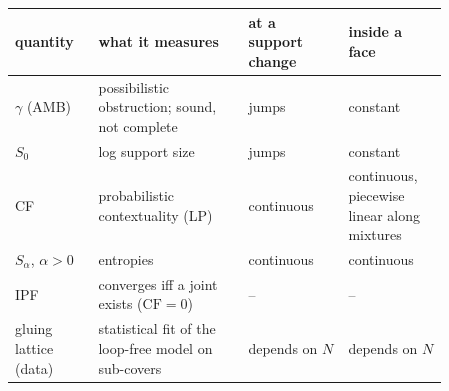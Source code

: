 \documentclass[11pt]{article}
\theoremstyle{definition}
\theoremstyle{remark}
\begin{document}
\begin{center}\small
\begin{tabular}{p{0.16\linewidth}p{0.3\linewidth}p{0.2\linewidth}p{0.2\linewidth}}
\toprule
quantity & what it measures & at a support change & inside a face\\
\midrule
$\gamma$ (AMB) & possibilistic obstruction; sound, not complete & jumps & constant\\
$S_0$ & log support size & jumps & constant\\
CF & probabilistic contextuality (LP) & continuous & continuous, piecewise linear along mixtures\\
$S_\alpha$, $\alpha>0$ & entropies & continuous & continuous\\
IPF & converges iff a joint exists ($\mathrm{CF}=0$) & -- & --\\
gluing lattice (data) & statistical fit of the loop-free model on sub-covers & depends on $N$ & depends on $N$\\
\bottomrule
\end{tabular}
\end{center}
\end{document}
